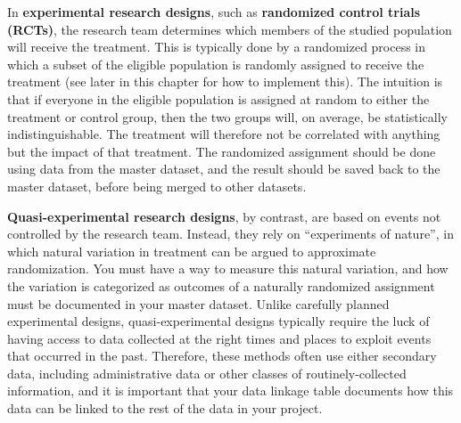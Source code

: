 
In \textbf{experimental research designs},
such as
\textbf{randomized control trials (RCTs)},
the research team determines which members
of the studied population will receive the treatment.
This is typically done by a randomized process
in which a subset of the eligible population
is randomly assigned to receive the treatment
(see later in this chapter for how to implement this).
The intuition is that if everyone in the eligible population
is assigned at random to either the treatment or control group,
then the two groups will, on average, be statistically indistinguishable.
The treatment will therefore not be correlated with anything
but the impact of that treatment.\cite{duflo2007using}
The randomized assignment should be done
using data from the master dataset,
and the result should be saved back to the master dataset,
before being merged to other datasets.


\textbf{Quasi-experimental research designs},
by contrast, are based on events not controlled by the research team.
Instead, they rely on ``experiments of nature'',
in which natural variation in treatment can be argued to approximate randomization.
You must have a way to measure this natural variation,
and how the variation is categorized as outcomes of a naturally randomized assignment
must be documented in your master dataset.
Unlike carefully planned experimental designs,
quasi-experimental designs typically require the luck
of having access to data collected at the right times and places
to exploit events that occurred in the past.
Therefore, these methods often use either secondary data,
including administrative data or other classes of routinely-collected information,
and it is important that your data linkage table documents
how this data can be linked to the rest of the data in your project.



